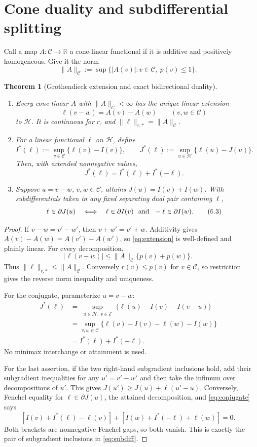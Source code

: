 \documentclass[11pt]{article}
\newtheorem{theorem}{Theorem}
\theoremstyle{definition}
\newcommand{\R}{\mathbb R}
\newcommand{\cC}{\mathcal C}
\newcommand{\cE}{\mathcal E}
\newcommand{\cH}{\mathcal H}
\begin{document}
\section{Cone duality and subdifferential splitting}

Call a map $A\colon\cC\to\R$ a cone-linear functional if it is additive and
positively homogeneous.  Give it the norm
\[
 \|A\|_{\cC}:=\sup\{|A(v)|:v\in\cC,\ p(v)\le1\}.
\]

\begin{theorem}[Grothendieck extension and exact bidirectional duality]
\label{thm:dual}
\begin{enumerate}[label=\textnormal{(\alph*)}]
\item Every cone-linear $A$ with $\|A\|_{\cC}<\infty$ has the unique
linear extension
\[
 \ell(v-w)=A(v)-A(w)\qquad(v,w\in\cC)
\tag{6.1}\label{eq:extension}
\]
to $\cH$.  It is continuous for $r$, and
$\|\ell\|_{r,*}=\|A\|_{\cC}$.

\item For a linear functional $\ell$ on $\cH$, define
\[
 I^*(\ell):=\sup_{v\in\cC}\{\ell(v)-I(v)\},\qquad
 J^*(\ell):=\sup_{u\in\cH}\{\ell(u)-J(u)\}.
\]
Then, with extended nonnegative values,
\[
 J^*(\ell)=I^*(\ell)+I^*(-\ell).
\tag{6.2}\label{eq:conjugate}
\]

\item Suppose $u=v-w$, $v,w\in\cC$, attains
$J(u)=I(v)+I(w)$.  With subdifferentials taken in any fixed separating
dual pair containing $\ell$,
\[
 \ell\in\partial J(u)
 \quad\Longleftrightarrow\quad
 \ell\in\partial I(v)\ \hbox{ and }\ -\ell\in\partial I(w).
\tag{6.3}\label{eq:subdiff}
\]
\end{enumerate}
\end{theorem}

\begin{proof}
If $v-w=v'-w'$, then $v+w'=v'+w$.  Additivity gives
$A(v)-A(w)=A(v')-A(w')$, so \eqref{eq:extension} is well-defined and
plainly linear.  For every decomposition,
\[
 |\ell(v-w)|\le\|A\|_{\cC}\{p(v)+p(w)\}.
\]
Thus $\|\ell\|_{r,*}\le\|A\|_{\cC}$.  Conversely $r(v)\le p(v)$ for
$v\in\cC$, so restriction gives the reverse norm inequality and uniqueness.

For the conjugate, parameterize $u=v-w$:
\begin{align*}
 J^*(\ell)
 &=\sup_{\substack{u\in\cH,\ v\in\cE}}
   \{\ell(u)-I(v)-I(v-u)\}\\
 &=\sup_{v,w\in\cC}
   \{\ell(v)-I(v)-\ell(w)-I(w)\}\\
 &=I^*(\ell)+I^*(-\ell).
\end{align*}
No minimax interchange or attainment is used.

For the last assertion, if the two right-hand subgradient inclusions hold,
add their subgradient inequalities for any $u'=v'-w'$ and then take the
infimum over decompositions of $u'$.  This gives
$J(u')\ge J(u)+\ell(u'-u)$.
Conversely, Fenchel equality for $\ell\in\partial J(u)$, the attained
decomposition, and \eqref{eq:conjugate} says
\[
 [I(v)+I^*(\ell)-\ell(v)]
 +[I(w)+I^*(-\ell)+\ell(w)]=0.
\]
Both brackets are nonnegative Fenchel gaps, so both vanish.  This is exactly
the pair of subgradient inclusions in \eqref{eq:subdiff}.
\end{proof}
\end{document}
